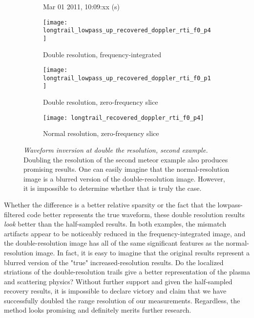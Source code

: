 \begin{figure}[tpb]
 \vspace{-1.5\baselineskip}
 \begin{subfigure}{\textwidth}
  \centering
  \textsf{\footnotesize Mar 01 2011, 10:09:xx (s)}
  
  \texttt{[image: longtrail\_lowpass\_up\_recovered\_doppler\_rti\_f0\_p4]}
  \caption{Double resolution, frequency-integrated}
  \label{fig:psrnd_lowpass_up_doppler0}
 \end{subfigure}
 
 \vspace{0.5\baselineskip}
 \begin{subfigure}{\textwidth}
  \centering
  \texttt{[image: longtrail\_lowpass\_up\_recovered\_doppler\_rti\_f0\_p1]}
  \caption{Double resolution, zero-frequency slice}
  \label{fig:msl_lowpass_up_doppler0}
 \end{subfigure}
 
 \vspace{0.5\baselineskip}
 \begin{subfigure}{\textwidth}
  \centering
  \texttt{[image: longtrail\_recovered\_doppler\_rti\_f0\_p4]}
  \caption{Normal resolution, zero-frequency slice}
  \label{fig:psrnd_doppler0}
 \end{subfigure}
 \caption[Waveform inversion at double the resolution, second example]{\emph{Waveform inversion at double the resolution, second example.} Doubling the resolution of the second meteor example also produces promising results. One can easily imagine that the normal-resolution image is a blurred version of the double-resolution image. However, it is impossible to determine whether that is truly the case.}
 \label{fig:longtrail_increased_resolution}
\end{figure}%
Whether the difference is a better relative sparsity or the fact that the lowpass-filtered code better represents the true waveform, these double resolution results \emph{look} better than the half-sampled results. In both examples, the mismatch artifacts appear to be noticeably reduced in the frequency-integrated image, and the double-resolution image has all of the same significant features as the normal-resolution image. In fact, it is easy to imagine that the original results represent a blurred version of the "true" increased-resolution results. Do the localized striations of the double-resolution trails give a better representation of the plasma and scattering physics? Without further support and given the half-sampled recovery results, it is impossible to declare victory and claim that we have successfully doubled the range resolution of our measurements. Regardless, the method looks promising and definitely merits further research.

